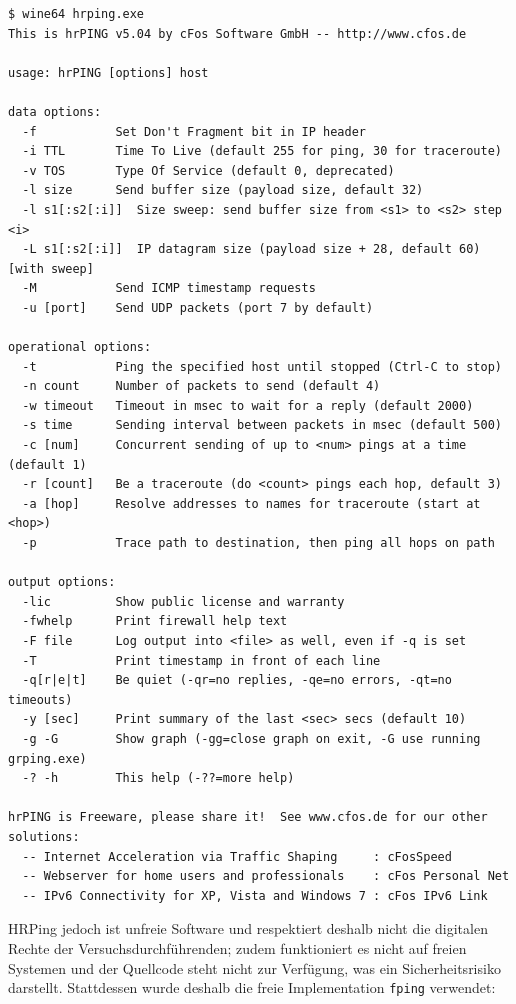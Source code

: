 \begin{verbatim}
$ wine64 hrping.exe
This is hrPING v5.04 by cFos Software GmbH -- http://www.cfos.de

usage: hrPING [options] host

data options:
  -f           Set Don't Fragment bit in IP header
  -i TTL       Time To Live (default 255 for ping, 30 for traceroute)
  -v TOS       Type Of Service (default 0, deprecated)
  -l size      Send buffer size (payload size, default 32)
  -l s1[:s2[:i]]  Size sweep: send buffer size from <s1> to <s2> step <i>
  -L s1[:s2[:i]]  IP datagram size (payload size + 28, default 60) [with sweep]
  -M           Send ICMP timestamp requests
  -u [port]    Send UDP packets (port 7 by default)

operational options:
  -t           Ping the specified host until stopped (Ctrl-C to stop)
  -n count     Number of packets to send (default 4)
  -w timeout   Timeout in msec to wait for a reply (default 2000)
  -s time      Sending interval between packets in msec (default 500)
  -c [num]     Concurrent sending of up to <num> pings at a time (default 1)
  -r [count]   Be a traceroute (do <count> pings each hop, default 3)
  -a [hop]     Resolve addresses to names for traceroute (start at <hop>)
  -p           Trace path to destination, then ping all hops on path

output options:
  -lic         Show public license and warranty
  -fwhelp      Print firewall help text
  -F file      Log output into <file> as well, even if -q is set
  -T           Print timestamp in front of each line
  -q[r|e|t]    Be quiet (-qr=no replies, -qe=no errors, -qt=no timeouts)
  -y [sec]     Print summary of the last <sec> secs (default 10)
  -g -G        Show graph (-gg=close graph on exit, -G use running grping.exe)
  -? -h        This help (-??=more help)

hrPING is Freeware, please share it!  See www.cfos.de for our other solutions:
  -- Internet Acceleration via Traffic Shaping     : cFosSpeed
  -- Webserver for home users and professionals    : cFos Personal Net
  -- IPv6 Connectivity for XP, Vista and Windows 7 : cFos IPv6 Link
\end{verbatim}

HRPing jedoch ist unfreie Software und respektiert deshalb nicht die
digitalen Rechte der Versuchsdurchführenden; zudem funktioniert es nicht
auf freien Systemen und der Quellcode steht nicht zur Verfügung, was ein
Sicherheitsrisiko darstellt. Stattdessen wurde deshalb die freie
Implementation \texttt{fping} verwendet:

